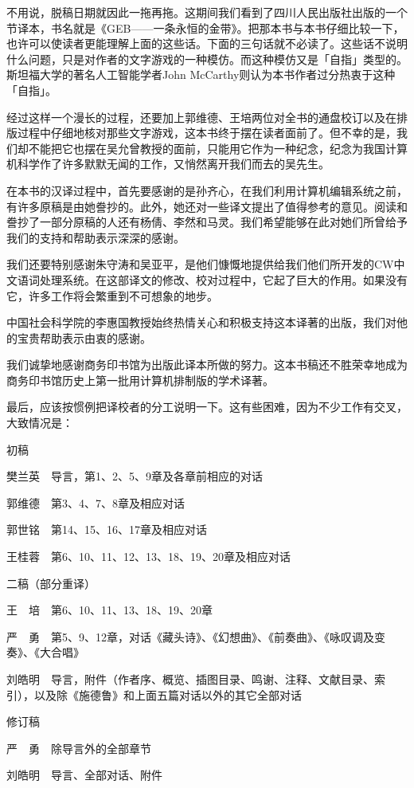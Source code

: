 \documentclass[
  12pt,
  twoside,
  openright,
  oldfontcommands,
]{memoir}
\begin{document}
不用说，脱稿日期就因此一拖再拖。这期间我们看到了四川人民出版社出版的一个节译本，书名就是《GEB------一条永恒的金带》。把那本书与本书仔细比较一下，也许可以使读者更能理解上面的这些话。下面的三句话就不必读了。这些话不说明什么问题，只是对作者的文字游戏的一种模仿。而这种模仿又是「自指」类型的。斯坦福大学的著名人工智能学者John
McCarthy则认为本书作者过分热衷于这种「自指」。

经过这样一个漫长的过程，还要加上郭维德、王培两位对全书的通盘校订以及在排版过程中仔细地核对那些文字游戏，这本书终于摆在读者面前了。但不幸的是，我们却不能把它也摆在吴允曾教授的面前，只能用它作为一种纪念，纪念为我国计算机科学作了许多默默无闻的工作，又悄然离开我们而去的吴先生。

在本书的汉译过程中，首先要感谢的是孙齐心，在我们利用计算机编辑系统之前，有许多原稿是由她誊抄的。此外，她还对一些译文提出了值得参考的意见。阅读和誊抄了一部分原稿的人还有杨倩、李然和马灵。我们希望能够在此对她们所曾给予我们的支持和帮助表示深深的感谢。

我们还要特别感谢朱守涛和吴亚平，是他们慷慨地提供给我们他们所开发的CW中文语词处理系统。在这部译文的修改、校对过程中，它起了巨大的作用。如果没有它，许多工作将会繁重到不可想象的地步。

中国社会科学院的李惠国教授始终热情关心和积极支持这本译著的出版，我们对他的宝贵帮助表示由衷的感谢。

我们诚挚地感谢商务印书馆为出版此译本所做的努力。这本书稿还不胜荣幸地成为商务印书馆历史上第一批用计算机排制版的学术译著。

最后，应该按惯例把译校者的分工说明一下。这有些困难，因为不少工作有交叉，大致情况是：

初稿

樊兰英　导言，第1、2、5、9章及各章前相应的对话

郭维德　第3、4、7、8章及相应对话

郭世铭　第14、15、16、17章及相应对话

王桂蓉　第6、10、11、12、13、18、19、20章及相应对话

二稿（部分重译）

王　培　第6、10、11、13、18、19、20章

严　勇　第5、9、12章，对话《藏头诗》、《幻想曲》、《前奏曲》、《咏叹调及变奏》、《大合唱》

刘皓明　导言，附件（作者序、概览、插图目录、鸣谢、注释、文献目录、索引），以及除《施德鲁》和上面五篇对话以外的其它全部对话

修订稿

严　勇　除导言外的全部章节

刘皓明　导言、全部对话、附件
\end{document}
